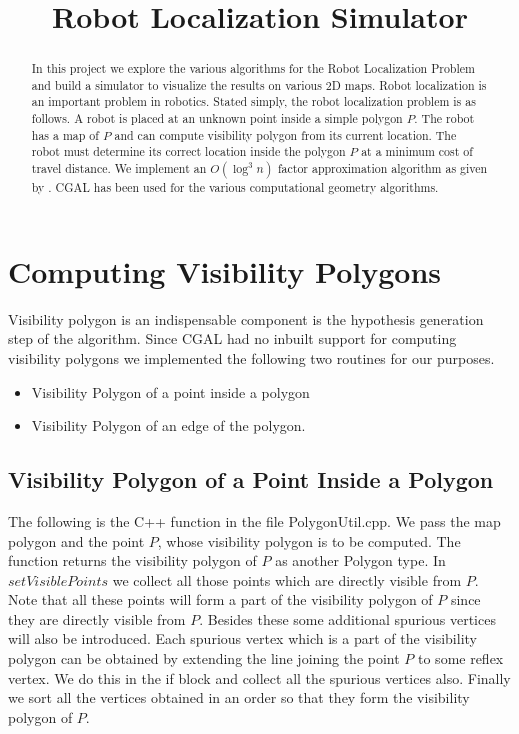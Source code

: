 \documentclass[a4paper,10pt]{article}
\title{Robot Localization Simulator}
\author{}
\begin{document}
\maketitle

\begin{abstract}
In this project we explore the various algorithms for the Robot Localization Problem and build a simulator to visualize the results on
various 2D maps.
Robot localization is an important problem in robotics. Stated simply, the robot localization problem is as follows. A robot is 
placed at an unknown point inside a simple polygon $ P $. The robot has a map of 
$ P$ and can compute visibility polygon from its current location. The robot must determine its correct 
location inside the polygon $P $ at a minimum cost of travel distance. We implement an ${O(\log^3 n)} $ factor approximation algorithm 
as given by \cite{key1}. CGAL \cite{key2} has been used for the various computational geometry algorithms.

\end{abstract}

\newpage

\section{Computing Visibility Polygons}
Visibility polygon is an indispensable component is the hypothesis generation step of the algorithm. Since CGAL had no inbuilt support
 for computing visibility polygons we implemented the following two routines for our purposes.
\begin{itemize}
 \item Visibility Polygon of a point inside a polygon
 \item Visibility Polygon of an edge of the polygon.
\end{itemize}

\subsection{Visibility Polygon of a Point Inside a Polygon}

The following is the C++ function in the file PolygonUtil.cpp. We pass the map polygon and the point $P$, whose visibility polygon is to be
 computed. The function returns the visibility polygon of $P$ as another Polygon type.
In $setVisiblePoints$ we collect all those points which are directly visible from $P$. Note that
 all these points will form a part of the visibility polygon of $P$ since they are directly visible from $P$. 
Besides these some additional spurious vertices will also be introduced. Each spurious vertex which is a part of the visibility polygon
 can be obtained by extending the line joining the point $P$ to some reflex vertex. We do this in the if block and collect all the 
spurious vertices also. Finally we sort all the vertices obtained in an order so that they form the visibility polygon of $P$.
\end{document}

